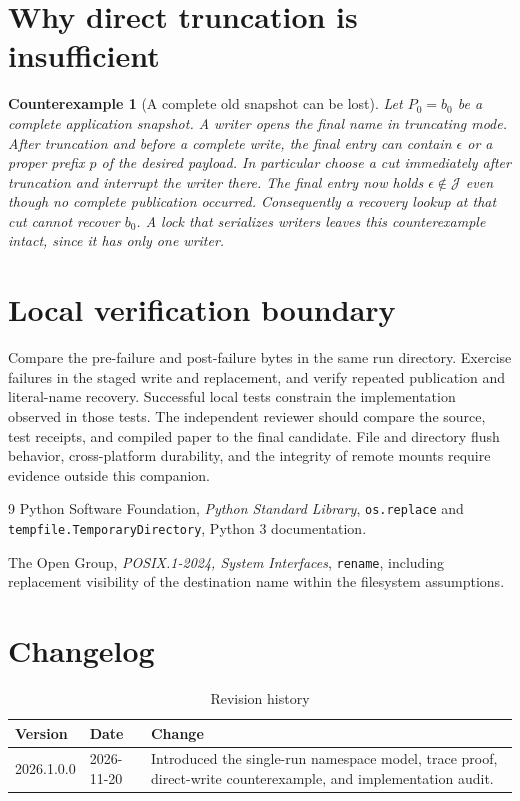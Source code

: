 \documentclass[12pt]{article}
\newtheorem{counterexample}[theorem]{Counterexample}
\newcommand{\Valid}{\mathcal{J}}
\begin{document}
\section{Why direct truncation is insufficient}
\label{sec:countermodel}
\begin{counterexample}[A complete old snapshot can be lost]
\label{cex:truncate}
Let $P_0=b_0$ be a complete application snapshot.
A writer opens the final name in truncating mode.
After truncation and before a complete write, the final entry
can contain $\epsilon$ or a proper prefix $p$ of the desired
payload. In particular choose a cut immediately after truncation
and interrupt the writer there. The final entry now holds
$\epsilon\notin\Valid$ even though no complete publication
occurred. Consequently a recovery lookup at that cut cannot
recover $b_0$. A lock that serializes writers leaves this
counterexample intact, since it has only one writer.
\end{counterexample}

\section{Local verification boundary}
\label{sec:verification}
Compare the pre-failure and post-failure bytes in the same run
directory. Exercise failures in the staged write and replacement,
and verify repeated publication and literal-name recovery.
Successful local tests constrain the implementation observed in
those tests. The independent reviewer should compare the source,
test receipts, and compiled paper to the final candidate.
File and directory flush behavior, cross-platform durability,
and the integrity of remote mounts require evidence outside this
companion.

\begin{thebibliography}{9}
Python Software Foundation, \textit{Python Standard Library},
\texttt{os.replace} and \texttt{tempfile.TemporaryDirectory},
Python 3 documentation.

The Open Group, \textit{POSIX.1-2024, System Interfaces},
\texttt{rename}, including replacement visibility of the
destination name within the filesystem assumptions.
\end{thebibliography}

\clearpage
\section*{Changelog}
\begin{table}[!htbp]
\centering\small
\caption{Revision history}
\label{tab:changelog}
\begin{tabularx}{\linewidth}{@{}l l X@{}}
\toprule
Version & Date & Change \\
\midrule
2026.1.0.0 & 2026-11-20 & Introduced the single-run namespace model,
trace proof, direct-write counterexample, and implementation audit. \\
\bottomrule
\end{tabularx}
\end{table}
\end{document}
